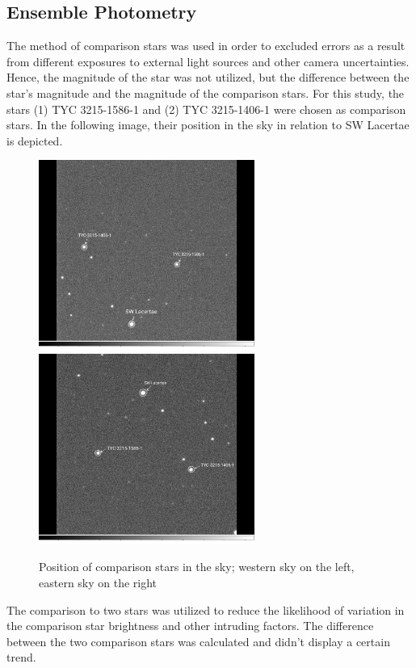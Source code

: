\subsection{Ensemble Photometry}
  \label{sec:great}
  The method of comparison stars was used in order to excluded errors as a result 
  from different exposures to external light sources and other camera uncertainties. 
  Hence, the magnitude of the star was not utilized, but the difference between the star’s 
  magnitude and the magnitude of the comparison stars. For this study, the stars 
  (1) TYC 3215-1586-1 and (2) TYC 3215-1406-1 were chosen as comparison stars. 
  In the following image, their position in the sky in relation to SW Lacertae
  is depicted.
  \begin{figure}[H]
    \centering
    \includegraphics[width=200pt]{WestHA~2.jpg}
    \hspace{1em}
    \includegraphics[width=200pt]{EastHA~2.jpg}
    \caption{Position of comparison stars in the sky; western sky on the left, eastern sky on the right}
    \label{fig:plot}
  \end{figure}
  \noindent The comparison to two stars was utilized to reduce the likelihood of 
  variation in the comparison star brightness and other intruding factors. The difference
  between the two comparison stars was calculated and didn't display a certain trend.
